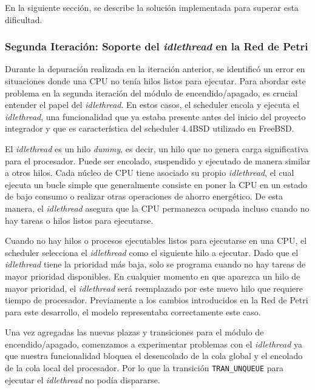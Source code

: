 En la siguiente sección, se describe la solución implementada para superar esta dificultad.

\subsubsection{Segunda Iteración: Soporte del \textit{idlethread} en la Red de Petri}

Durante la depuración realizada en la iteración anterior, se identificó un error en situaciones donde una CPU no tenía hilos listos para ejecutar. Para abordar este problema en la segunda iteración del módulo de encendido/apagado, es crucial entender el papel del \textit{idlethread}. En estos casos, el scheduler encola y ejecuta el \textit{idlethread}, una funcionalidad que ya estaba presente antes del inicio del proyecto integrador y que es característica del scheduler 4.4BSD utilizado en FreeBSD.\par

El \textit{idlethread} es un hilo \textit{dummy}, es decir, un hilo que no genera carga significativa para el procesador. Puede ser encolado, suspendido y ejecutado de manera similar a otros hilos. Cada núcleo de CPU tiene asociado su propio \textit{idlethread}, el cual ejecuta un bucle simple que generalmente consiste en poner la CPU en un estado de bajo consumo o realizar otras operaciones de ahorro energético. De esta manera, el \textit{idlethread} asegura que la CPU permanezca ocupada incluso cuando no hay tareas o hilos listos para ejecutarse.\par

Cuando no hay hilos o procesos ejecutables listos para ejecutarse en una CPU, el scheduler selecciona el \textit{idlethread} como el siguiente hilo a ejecutar. Dado que el \textit{idlethread} tiene la prioridad más baja, solo se programa cuando no hay tareas de mayor prioridad disponibles. En cualquier momento en que aparezca un hilo de mayor prioridad, el \textit{idlethread} será reemplazado por este nuevo hilo que requiere tiempo de procesador. Previamente a los cambios introducidos en la Red de Petri para este desarrollo, el modelo representaba correctamente este caso.\par

Una vez agregadas las nuevas plazas y transiciones para el módulo de encendido/apagado, comenzamos a experimentar problemas con el \textit{idlethread} ya que nuestra funcionalidad bloquea el desencolado de la cola global y el encolado de la cola local del procesador. Por lo que la transición \texttt{TRAN\_UNQUEUE} para ejecutar el \textit{idlethread} no podía dispararse.\par

